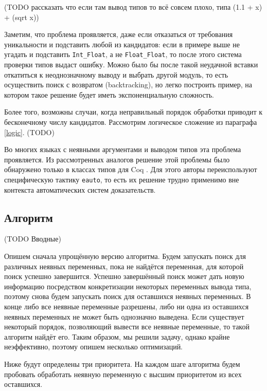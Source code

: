 \documentclass[../diploma.tex]{subfiles}
\begin{document}
(TODO рассказать что если там вывод типов то всё совсем плохо, типа (1.1 + x) + (sqrt x))

Заметим, что проблема проявляется, даже если отказаться от требования уникальности и подставить любой из кандидатов: если в примере выше не угадать и подставить \texttt{Int_Float}, а не \texttt{Float_Float}, то после этого система проверки типов выдаст ошибку. Можно было бы после такой неудачной вставки откатиться к неоднозначному выводу и выбрать другой модуль, то есть осуществить поиск с возвратом (backtracking), но легко построить пример, на котором такое решение будет иметь экспоненциальную сложность.

Более того, возможны случаи, когда неправильный порядок обработки приводит к бесконечному числу кандидатов. Рассмотрим логическое сложение из параграфа \ref{logic}. (TODO)

Во многих языках с неявными аргументами и выводом типов эта проблема проявляется. Из рассмотренных аналогов решение этой проблемы было обнаружено только в классах типов для Coq \cite{coq_typeclasses}. Для этого авторы переиспользуют специфическую тактику \texttt{eauto}, то есть их решение трудно применимо вне контекста автоматических систем доказательств.

\subsection{Алгоритм}

(TODO Вводные)

Опишем сначала упрощённую версию алгоритма. Будем запускать поиск для различных неявных переменных, пока не найдётся переменная, для которой поиск успешно завершится. Успешно завершённый поиск может дать новую информацию посредством конкретизации некоторых переменных вывода типа, поэтому снова будем запускать поиск для оставшихся неявных переменных. В конце либо все неявные переменные разрешены, либо ни одна из оставшихся неявных переменных не может быть однозначно выведена. Если существует некоторый порядок, позволяющий вывести все неявные переменные, то такой алгоритм найдёт его. Таким образом, мы решили задачу, однако крайне неэффективно, поэтому опишем несколько оптимизаций.

Ниже будут определены три приоритета. На каждом шаге алгоритма будем пробовать обработать неявную переменную с высшим приоритетом из всех оставшихся.
\end{document}
